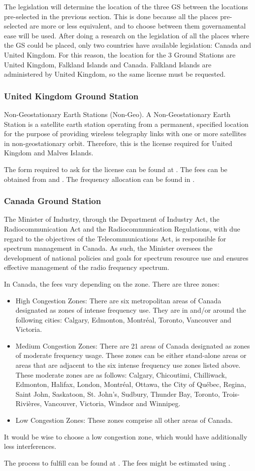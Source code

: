 The legislation will determine the location of the three GS between the locations pre-selected in the previous section. This is done because all the places pre-selected are more or less equivalent, and to choose between them governamental ease will be used. After doing a research on the legislation of all the places where the GS could be placed, only two countries have available legislation: Canada and United Kingdom. For this reason, the location for the 3 Ground Stations are United Kingdom, Falkland Islands and Canada. Falkland Islands are administered by United Kingdom, so the same license must be requested.

\subsubsection{United Kingdom Ground Station}
Non-Geostationary Earth Stations (Non-Geo). A Non-Geostationary Earth Station is a satellite earth station operating from a permanent, specified location for the purpose of providing wireless telegraphy links with one or more satellites in non-geostationary orbit. Therefore, this is the license required for United Kingdom and Malves Islands.

The form required to ask for the license can be found at \cite{UKForm}. The fees can be obtained from \cite{UKFees} and \cite{UKMHzFees}. The frequency allocation can be found in \cite{UKAllocation}.

\subsubsection{Canada Ground Station}
The Minister of Industry, through the Department of Industry Act, the Radiocommunication Act and the Radiocommunication Regulations, with due regard to the objectives of the Telecommunications Act, is responsible for spectrum management in Canada. As such, the Minister oversees the development of national policies and goals for spectrum resource use and ensures effective management of the radio frequency spectrum.

In Canada, the fees vary depending on the zone. There are three zones:
\begin{itemize}
\item High Congestion Zones: There are six metropolitan areas of Canada designated as zones of intense frequency use. They are in and/or around the following cities: Calgary, Edmonton, Montréal, Toronto, Vancouver and Victoria.
\item Medium Congestion Zones: There are 21 areas of Canada designated as zones of moderate frequency usage. These zones can be either stand-alone areas or areas that are adjacent to the six intense frequency use zones listed above. These moderate zones are as follows: Calgary, Chicoutimi, Chilliwack, Edmonton, Halifax, London, Montréal, Ottawa, the City of Québec, Regina, Saint John, Saskatoon, St. John's, Sudbury, Thunder Bay, Toronto, Trois-Rivières, Vancouver, Victoria, Windsor and Winnipeg.
\item Low Congestion Zones: These zones comprise all other areas of Canada.
\end{itemize}

It would be wise to choose a low congestion zone, which would have additionally less interferences. 

The process to fulfill can be found at \cite{CndForm}. The fees might be estimated using \cite{CndFees}.